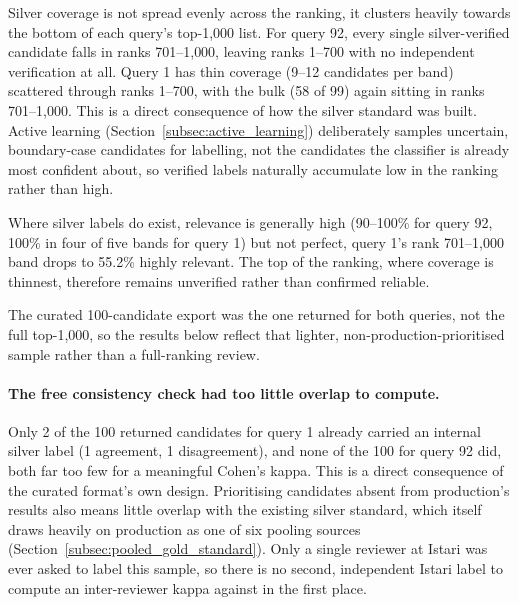 \documentclass[a4paper,oneside,bibliography=totoc]{scrbook}
\begin{document}
Silver coverage is not spread evenly across the ranking, it clusters heavily towards the bottom of each query's top-1{,}000 list. For query 92, every single silver-verified candidate falls in ranks 701--1{,}000, leaving ranks 1--700 with no independent verification at all. Query 1 has thin coverage (9--12 candidates per band) scattered through ranks 1--700, with the bulk (58 of 99) again sitting in ranks 701--1{,}000. This is a direct consequence of how the silver standard was built. Active learning (Section~\ref{subsec:active_learning}) deliberately samples uncertain, boundary-case candidates for labelling, not the candidates the classifier is already most confident about, so verified labels naturally accumulate low in the ranking rather than high.

Where silver labels do exist, relevance is generally high (90--100\% for query 92, 100\% in four of five bands for query 1) but not perfect, query 1's rank 701--1{,}000 band drops to 55.2\% highly relevant. The top of the ranking, where coverage is thinnest, therefore remains unverified rather than confirmed reliable.

\label{subsec:external_review_result}

The curated 100-candidate export was the one returned for both queries, not the full top-1{,}000, so the results below reflect that lighter, non-production-prioritised sample rather than a full-ranking review.

\paragraph{The free consistency check had too little overlap to compute.} Only 2 of the 100 returned candidates for query 1 already carried an internal silver label (1 agreement, 1 disagreement), and none of the 100 for query 92 did, both far too few for a meaningful Cohen's kappa. This is a direct consequence of the curated format's own design. Prioritising candidates absent from production's results also means little overlap with the existing silver standard, which itself draws heavily on production as one of six pooling sources (Section~\ref{subsec:pooled_gold_standard}). Only a single reviewer at Istari was ever asked to label this sample, so there is no second, independent Istari label to compute an inter-reviewer kappa against in the first place.
\end{document}
